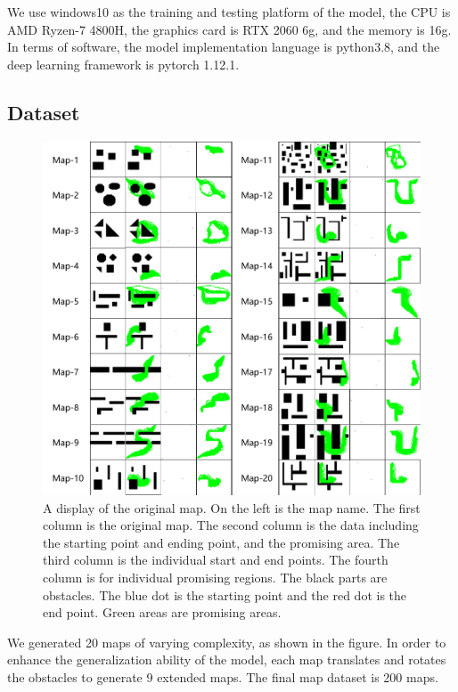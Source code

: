 \documentclass[smallcondensed]{svjour3}     %
\begin{document}
We use windows10 as the training and testing platform of the model, the CPU is AMD Ryzen-7 4800H, the graphics card is RTX 2060 6g, and the memory is 16g. 
In terms of software, the model implementation language is python3.8, and the deep learning framework is pytorch 1.12.1.

\subsection{Dataset}
\begin{figure}
\centering
\includegraphics[scale=0.45]{data-set.pdf}%
\caption{A display of the original map.
On the left is the map name.
The first column is the original map.
The second column is the data including the starting point and ending point, and the promising area.
The third column is the individual start and end points.
The fourth column is for individual promising regions.
The black parts are obstacles.
The blue dot is the starting point and the red dot is the end point.
Green areas are promising areas.
}     
\label{fig:data-set}
\end{figure}

We generated 20 maps of varying complexity, as shown in the figure.
In order to enhance the generalization ability of the model, each map translates and rotates the obstacles to generate 9 extended maps.
The final map dataset is 200 maps.
\end{document}
